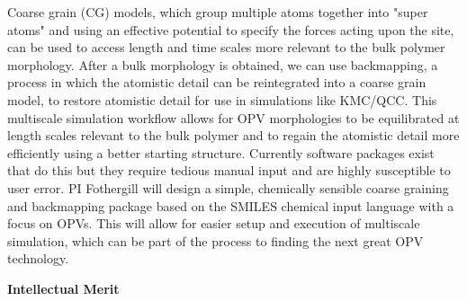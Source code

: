 Coarse grain (CG) models, which group multiple atoms together into "super atoms" and using an effective potential to specify the forces acting upon the site, can be used to access length and time scales more relevant to the bulk polymer morphology.
After a bulk morphology is obtained, we can use backmapping, a process in which the atomistic detail can be reintegrated into a coarse grain model, to restore atomistic detail for use in simulations like KMC/QCC.
This multiscale simulation workflow allows for OPV morphologies to be equilibrated at length scales relevant to the bulk polymer and to regain the atomistic detail more efficiently using a better starting structure.
Currently software packages exist that do this but they require tedious manual input and are highly susceptible to user error.
PI Fothergill will design a simple, chemically sensible coarse graining and backmapping package based on the SMILES chemical input language with a focus on OPVs.
This will allow for easier setup and execution of multiscale simulation, which can be part of the process to finding the next great OPV technology.

\begin{center}
    \textbf{Intellectual Merit}
\end{center}


